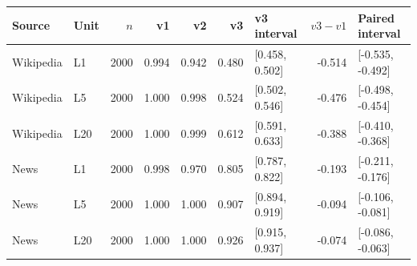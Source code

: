 \begin{tabular}{llrrrrlrl}
\toprule
Source & Unit & $n$ & v1 & v2 & v3 & v3 interval & $v3-v1$ & Paired interval \\
\midrule
Wikipedia & L1 & 2000 & 0.994 & 0.942 & 0.480 & [0.458, 0.502] & -0.514 & [-0.535, -0.492] \\
Wikipedia & L5 & 2000 & 1.000 & 0.998 & 0.524 & [0.502, 0.546] & -0.476 & [-0.498, -0.454] \\
Wikipedia & L20 & 2000 & 1.000 & 0.999 & 0.612 & [0.591, 0.633] & -0.388 & [-0.410, -0.368] \\
News & L1 & 2000 & 0.998 & 0.970 & 0.805 & [0.787, 0.822] & -0.193 & [-0.211, -0.176] \\
News & L5 & 2000 & 1.000 & 1.000 & 0.907 & [0.894, 0.919] & -0.094 & [-0.106, -0.081] \\
News & L20 & 2000 & 1.000 & 1.000 & 0.926 & [0.915, 0.937] & -0.074 & [-0.086, -0.063] \\
\bottomrule
\end{tabular}

